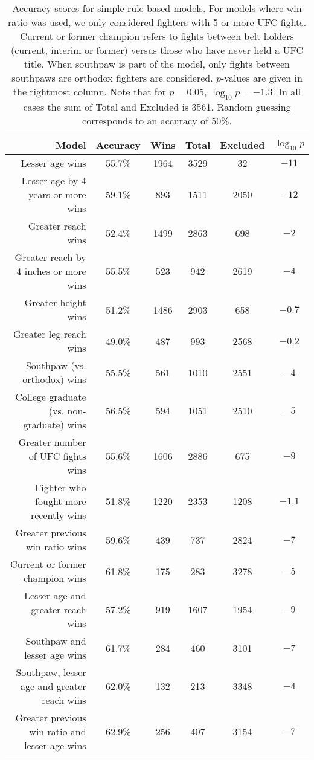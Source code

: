\begin{center}
\begin{table}[h]
\begin{tabular}{r|ccccc}
  \toprule
  Model & Accuracy & Wins & Total & Excluded & $\log_{10}p$\\
  \hline
  Lesser age wins & 55.7\% & 1964 & 3529 & 32 & $-11$\\
  Lesser age by 4 years or more wins & 59.1\% & 893 & 1511 & 2050 & $-12$\\
  Greater reach wins & 52.4\% & 1499 & 2863 & 698 & $-2$\\
  Greater reach by 4 inches or more wins & 55.5\% & 523 & 942 & 2619 & $-4$\\
  Greater height wins & 51.2\% & 1486 & 2903 & 658 & $-0.7$\\
  Greater leg reach wins & 49.0\% & 487 & 993 & 2568 & $-0.2$\\
  Southpaw (vs. orthodox) wins & 55.5\% & 561 & 1010 & 2551 & $-4$\\
  College graduate (vs. non-graduate) wins & 56.5\% & 594 & 1051 & 2510 & $-5$\\
  Greater number of UFC fights wins & 55.6\% & 1606 & 2886 & 675 & $-9$\\
  Fighter who fought more recently wins & 51.8\% & 1220 & 2353 & 1208 & $-1.1$\\
  Greater previous win ratio wins & 59.6\% & 439 & 737 & 2824 & $-7$\\
  Current or former champion wins & 61.8\% & 175 & 283 & 3278 & $-5$\\
  \hline
  Lesser age and greater reach wins & 57.2\% & 919 & 1607 & 1954 & $-9$\\
  Southpaw and lesser age wins & 61.7\% & 284 & 460 & 3101 & $-7$\\
  Southpaw, lesser age and greater reach wins & 62.0\% & 132 & 213 & 3348 & $-4$\\
  Greater previous win ratio and lesser age wins & 62.9\% & 256 & 407 & 3154 & $-7$\\
  \bottomrule
\end{tabular}
\caption{Accuracy scores for simple rule-based models. For models where win ratio was used, we only considered
fighters with 5 or more UFC fights. Current or former champion refers to fights
between belt holders (current, interim or former) versus those who have never held a
UFC title. When southpaw is part of the model, only fights between southpaws are
orthodox fighters are considered. $p$-values are given in the rightmost column. Note that for $p=0.05$, $\log_{10}p = -1.3$. In all
cases the sum of 
Total and Excluded is 3561. Random guessing corresponds to an accuracy of 50\%.}
\label{table_simple_rules}
\end{table}
\end{center}

